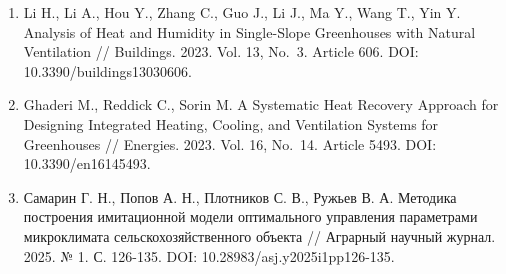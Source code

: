 \documentclass[a4paper,14pt]{extarticle}
\begin{document}
\begin{enumerate}
  Ogunlowo Q. O., Akpenpuun T. D., Na W.-H., Rabiu A., Adesanya M. A.,
  Addae K. S., Kim H.-T., Lee H.-W. Analysis of Heat and Mass
  Distribution in a Single- and Multi-Span Greenhouse Microclimate //
  Agriculture. 2021. Vol. 11, No.~9. Article 891. DOI:
  10.3390/agriculture11090891.
\item
  Li H., Li A., Hou Y., Zhang C., Guo J., Li J., Ma Y., Wang T., Yin Y.
  Analysis of Heat and Humidity in Single-Slope Greenhouses with Natural
  Ventilation // Buildings. 2023. Vol. 13, No.~3. Article 606. DOI:
  10.3390/buildings13030606.
\item
  Ghaderi M., Reddick C., Sorin M. A Systematic Heat Recovery Approach
  for Designing Integrated Heating, Cooling, and Ventilation Systems for
  Greenhouses // Energies. 2023. Vol. 16, No.~14. Article 5493. DOI:
  10.3390/en16145493.
\item
  Самарин Г. Н., Попов А. Н., Плотников С. В., Ружьев В. А. Методика
  построения имитационной модели оптимального управления параметрами
  микроклимата сельскохозяйственного объекта // Аграрный научный журнал.
  2025. № 1. С. 126-135. DOI: 10.28983/asj.y2025i1pp126-135.
\end{enumerate}
\end{document}

